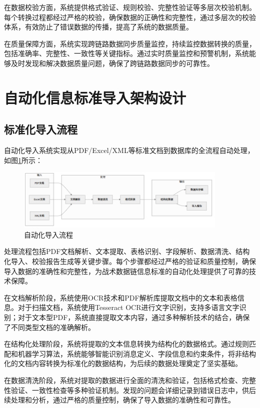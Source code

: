 在数据校验方面，系统提供格式验证、规则校验、完整性验证等多层次校验机制。每个转换过程都经过严格的校验，确保数据的正确性和完整性，通过多层次的校验体系，有效防止了错误数据的传播，提高了系统的数据质量。

在质量保障方面，系统实现跨链路数据同步质量监控，持续监控数据转换的质量，包括准确率、完整性、一致性等关键指标。通过实时质量监控和预警机制，系统能够及时发现和解决数据质量问题，确保了跨链路数据同步的可靠性。

\section{自动化信息标准导入架构设计}

\subsection{标准化导入流程}

自动化导入系统实现从PDF/Excel/XML等标准文档到数据库的全流程自动处理，如图\ref{fig:import_pipeline}所示：

\begin{figure}[H]
    \centering
    \includegraphics[width=0.9\textwidth]{chapters/fig-0/import_pipeline_simple.png}
    \caption{自动化导入流程}
    \label{fig:import_pipeline}
\end{figure}

处理流程包括PDF文档解析、文本提取、表格识别、字段解析、数据清洗、结构化导入、校验报告生成等关键步骤。每个步骤都经过严格的验证和质量控制，确保导入数据的准确性和完整性，为战术数据链信息标准的自动化处理提供了可靠的技术保障。

在文档解析阶段，系统使用OCR技术和PDF解析库提取文档中的文本和表格信息。对于扫描文档，系统使用Tesseract OCR进行文字识别，支持多语言文字识别；对于文本型PDF，系统直接提取文本内容，通过多种解析技术的结合，确保了不同类型文档的准确解析。

在结构化处理阶段，系统将提取的文本信息转换为结构化的数据格式。通过规则匹配和机器学习算法，系统能够智能识别消息定义、字段信息和约束条件，将非结构化的文档内容转换为标准化的数据结构，为后续的数据处理奠定了坚实基础。

在数据清洗阶段，系统对提取的数据进行全面的清洗和验证，包括格式检查、完整性验证、一致性检查等多种验证机制。发现的问题会详细记录到错误日志中，供后续处理和分析，通过严格的质量控制，确保了导入数据的准确性和可靠性。

